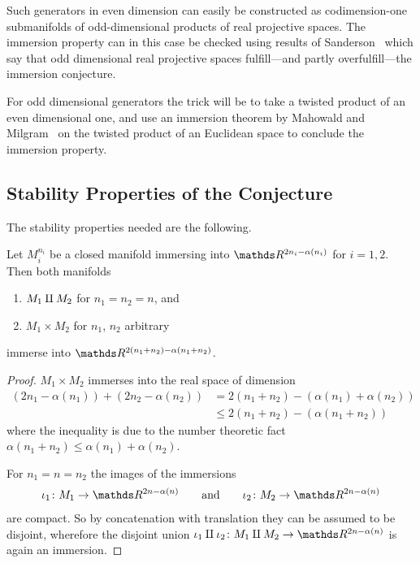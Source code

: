 Such generators in even dimension can easily be constructed as
codimension-one submanifolds of odd-dimensional products of
real projective spaces. The immersion property can in this case be
checked using results of Sanderson~\cite{sanderson} which say that
odd dimensional real projective spaces fulfill---and partly
overfulfill---the immersion conjecture.

For odd dimensional generators the trick will be to take a twisted
product of an even dimensional one, and use an immersion theorem by
Mahowald and Milgram~\cite{milgram} on the twisted product of an
Euclidean space to conclude the immersion property.

\subsection{Stability Properties of the Conjecture}
The stability properties needed are the following.
\begin{Lem}\label{lem:brownstableunderringops}
  Let $M_i^{n_i}$ be a closed manifold immersing into
  $\R^{2n_i-\alpha(n_i)}$ for $i=1,2$.
  Then both manifolds
  \begin{enumerate}
  \item $M_1\amalg M_2$ for $n_1=n_2=n$, and
  \item $M_1\times M_2$ for $n_1$, $n_2$ arbitrary
  \end{enumerate}
  immerse into $\R^{2(n_1+n_2)-\alpha(n_1+n_2)}$.
  \begin{proof}
    $M_1\times M_2$ immerses into the real space of dimension
    \begin{align*}
      \left( 2n_1-\alpha(n_1) \right)
      + \left( 2n_2-\alpha(n_2) \right)
      &= 2(n_1+n_2) - \left(\alpha(n_1)+\alpha(n_2)\right)\\
      &\leq 2(n_1+n_2) - \left(\alpha(n_1 + n_2)\right)
    \end{align*}
    where the inequality is due to the number theoretic fact
    $\alpha(n_1+n_2) \leq \alpha(n_1)+\alpha(n_2)$.

    For $n_1=n=n_2$ the images of the immersions
    \begin{gather*}
      \iota_1\colon M_1\to\R^{2n-\alpha(n)}
      \qquad \text{and} \qquad
      \iota_2\colon M_2\to\R^{2n-\alpha(n)}
    \end{gather*}
    are compact. So by
    concatenation with translation they can be assumed to be disjoint,
    wherefore the disjoint union
    $\iota_1\disjointsum\iota_2\colon M_1\disjointsum M_2\to\R^{2n-\alpha(n)}$
    is again an immersion.
  \end{proof}
\end{Lem}

